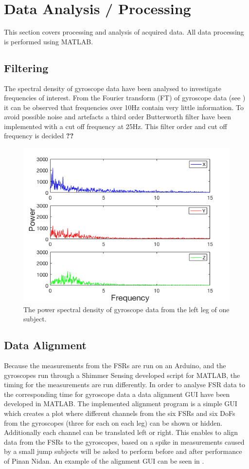 \section{Data Analysis / Processing}
This section covers processing and analysis of acquired data. All data processing is performed using MATLAB. 

\subsection{Filtering}
The spectral density of gyroscope data have been analysed to investigate frequencies of interest. From the Fourier transform (FT) of gyroscope data (see ) it can be observed that frequencies over 10Hz contain very little information. To avoid possible noise and artefacts a third order Butterworth filter have been implemented with a cut off frequency at 25Hz. This filter order and cut off frequency is decided \textbf{??}

\begin{figure}[H]
	\includegraphics[width=.6\textwidth]{figures/gyroFFTPlot}
	\caption{The power spectral density of gyroscope data from the left leg of one subject.}
	\label{fig:gyroFFTPlot}  %
\end{figure}



\subsection{Data Alignment}
Because the measurements from the FSRs are run on an Arduino, and the gyroscopes run through a Shimmer Sensing developed script for MATLAB, the timing for the measurements are run differently. In order to analyse FSR data to the corresponding time for gyroscope data a data alignment GUI have been developed in MATLAB. The implemented alignment program is a simple GUI which creates a plot where different channels from the six FSRs and six DoFs from the gyroscopes (three for each on each leg) can be shown or hidden. Additionally each channel can be translated left or right. This enables to align data from the FSRs to the gyroscopes, based on a spike in measurements caused by a small jump subjects will be asked to perform before and after performance of Pinan Nidan. An example of the alignment GUI can be seen in .

